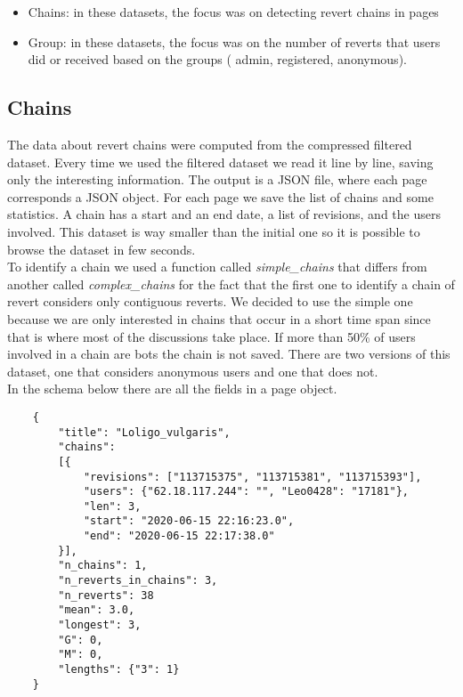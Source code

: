\begin{itemize}
    \item Chains: in these datasets, the focus was on detecting revert chains in pages 
    \item Group: in these datasets, the focus was on the number of reverts that users did or received based on the groups ( admin, registered, anonymous).
\end{itemize}

\subsection{Chains}
The data about revert chains were computed from the compressed filtered dataset. Every time we used
the filtered dataset we read it line by line, saving only the interesting information. The output
is a JSON file, where each page corresponds a JSON object. For each page we save the list of chains
and some statistics. A chain has a start and an end date, a list of revisions, and the users
involved. This dataset is way smaller than the initial one so it is possible to browse the dataset
in few seconds.\\


To identify a chain we used a function called \textit{simple\_chains} that differs from another called
\textit{complex\_chains} for the fact that the first one to identify a chain of revert considers only
contiguous reverts. We decided to use the simple one because we are only interested in chains that
occur in a short time span since that is where most of the discussions take place. If more than
50\% of users involved in a chain are bots the chain is not saved. There are two versions of this
dataset, one that considers anonymous users and one that does not. \\

In the schema below there are all the fields in a page object. 
\begin{verbatim}
    {
        "title": "Loligo_vulgaris", 
        "chains": 
        [{
            "revisions": ["113715375", "113715381", "113715393"], 
            "users": {"62.18.117.244": "", "Leo0428": "17181"}, 
            "len": 3, 
            "start": "2020-06-15 22:16:23.0", 
            "end": "2020-06-15 22:17:38.0"
        }], 
        "n_chains": 1, 
        "n_reverts_in_chains": 3, 
        "n_reverts": 38
        "mean": 3.0, 
        "longest": 3, 
        "G": 0,
        "M": 0, 
        "lengths": {"3": 1}
    }
    
\end{verbatim}



